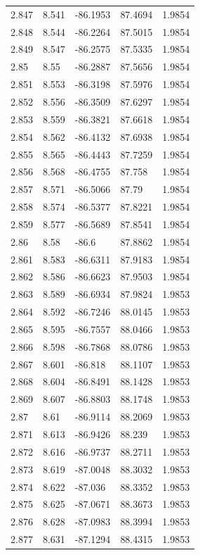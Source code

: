 \begin{tabular}{lllll}
2.847 & 8.541 & -86.1953 & 87.4694 & 1.9854 \\
2.848 & 8.544 & -86.2264 & 87.5015 & 1.9854 \\
2.849 & 8.547 & -86.2575 & 87.5335 & 1.9854 \\
2.85 & 8.55 & -86.2887 & 87.5656 & 1.9854 \\
2.851 & 8.553 & -86.3198 & 87.5976 & 1.9854 \\
2.852 & 8.556 & -86.3509 & 87.6297 & 1.9854 \\
2.853 & 8.559 & -86.3821 & 87.6618 & 1.9854 \\
2.854 & 8.562 & -86.4132 & 87.6938 & 1.9854 \\
2.855 & 8.565 & -86.4443 & 87.7259 & 1.9854 \\
2.856 & 8.568 & -86.4755 & 87.758 & 1.9854 \\
2.857 & 8.571 & -86.5066 & 87.79 & 1.9854 \\
2.858 & 8.574 & -86.5377 & 87.8221 & 1.9854 \\
2.859 & 8.577 & -86.5689 & 87.8541 & 1.9854 \\
2.86 & 8.58 & -86.6 & 87.8862 & 1.9854 \\
2.861 & 8.583 & -86.6311 & 87.9183 & 1.9854 \\
2.862 & 8.586 & -86.6623 & 87.9503 & 1.9854 \\
2.863 & 8.589 & -86.6934 & 87.9824 & 1.9853 \\
2.864 & 8.592 & -86.7246 & 88.0145 & 1.9853 \\
2.865 & 8.595 & -86.7557 & 88.0466 & 1.9853 \\
2.866 & 8.598 & -86.7868 & 88.0786 & 1.9853 \\
2.867 & 8.601 & -86.818 & 88.1107 & 1.9853 \\
2.868 & 8.604 & -86.8491 & 88.1428 & 1.9853 \\
2.869 & 8.607 & -86.8803 & 88.1748 & 1.9853 \\
2.87 & 8.61 & -86.9114 & 88.2069 & 1.9853 \\
2.871 & 8.613 & -86.9426 & 88.239 & 1.9853 \\
2.872 & 8.616 & -86.9737 & 88.2711 & 1.9853 \\
2.873 & 8.619 & -87.0048 & 88.3032 & 1.9853 \\
2.874 & 8.622 & -87.036 & 88.3352 & 1.9853 \\
2.875 & 8.625 & -87.0671 & 88.3673 & 1.9853 \\
2.876 & 8.628 & -87.0983 & 88.3994 & 1.9853 \\
2.877 & 8.631 & -87.1294 & 88.4315 & 1.9853 \\

\end{tabular}
